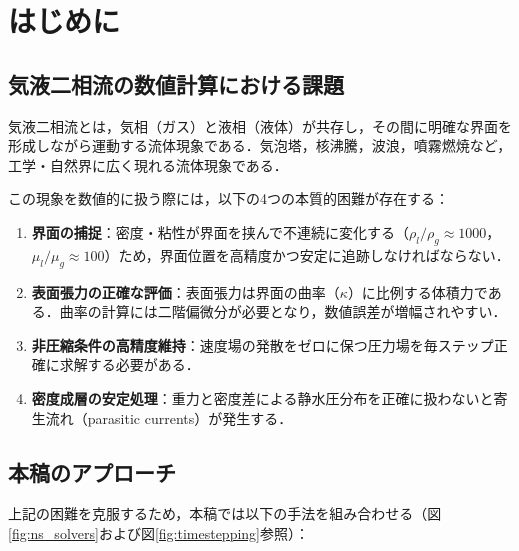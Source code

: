 \documentclass[12pt, a4paper, titlepage, xelatex, ja=standard]{bxjsarticle}
\begin{document}
\tableofcontents
\newpage

\section{はじめに}
\label{sec:intro}

\subsection{気液二相流の数値計算における課題}

気液二相流とは，気相（ガス）と液相（液体）が共存し，その間に明確な界面を形成しながら運動する流体現象である．気泡塔，核沸騰，波浪，噴霧燃焼など，工学・自然界に広く現れる流体現象である．

この現象を数値的に扱う際には，以下の4つの本質的困難が存在する：

\begin{enumerate}
  \item \textbf{界面の捕捉}：密度・粘性が界面を挟んで不連続に変化する（$\rho_l/\rho_g \approx 1000$，$\mu_l/\mu_g \approx 100$）ため，界面位置を高精度かつ安定に追跡しなければならない．
  \item \textbf{表面張力の正確な評価}：表面張力は界面の曲率（$\kappa$）に比例する体積力である．曲率の計算には二階偏微分が必要となり，数値誤差が増幅されやすい．
  \item \textbf{非圧縮条件の高精度維持}：速度場の発散をゼロに保つ圧力場を毎ステップ正確に求解する必要がある．
  \item \textbf{密度成層の安定処理}：重力と密度差による静水圧分布を正確に扱わないと寄生流れ（parasitic currents）が発生する．
\end{enumerate}

\subsection{本稿のアプローチ}

上記の困難を克服するため，本稿では以下の手法を組み合わせる（図\ref{fig:ns_solvers}および図\ref{fig:timestepping}参照）：
\end{document}
